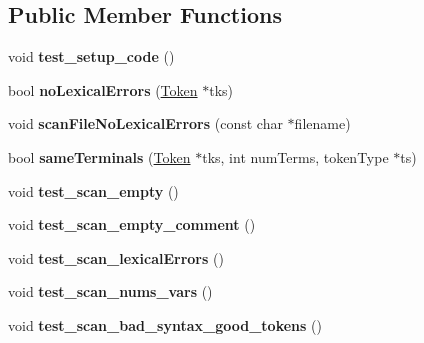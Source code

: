 \subsection*{Public Member Functions}
\begin{DoxyCompactItemize}
\item 
\hypertarget{classScannerTestSuite_ade832b9b4b3bd92980d43c4050cebd2c}{void {\bfseries test\-\_\-setup\-\_\-code} ()}\label{classScannerTestSuite_ade832b9b4b3bd92980d43c4050cebd2c}

\item 
\hypertarget{classScannerTestSuite_a681db679ec2418f862f478fa7678942b}{bool {\bfseries no\-Lexical\-Errors} (\hyperlink{classToken}{Token} $\ast$tks)}\label{classScannerTestSuite_a681db679ec2418f862f478fa7678942b}

\item 
\hypertarget{classScannerTestSuite_a01dc6065a02127accc049627ae234129}{void {\bfseries scan\-File\-No\-Lexical\-Errors} (const char $\ast$filename)}\label{classScannerTestSuite_a01dc6065a02127accc049627ae234129}

\item 
\hypertarget{classScannerTestSuite_a97c50725866b3a5b36c36488053a59bc}{bool {\bfseries same\-Terminals} (\hyperlink{classToken}{Token} $\ast$tks, int num\-Terms, token\-Type $\ast$ts)}\label{classScannerTestSuite_a97c50725866b3a5b36c36488053a59bc}

\item 
\hypertarget{classScannerTestSuite_a01beafb44a33f4d80baf9a4208919c07}{void {\bfseries test\-\_\-scan\-\_\-empty} ()}\label{classScannerTestSuite_a01beafb44a33f4d80baf9a4208919c07}

\item 
\hypertarget{classScannerTestSuite_a304719dd961df0714d372010cdf99ef1}{void {\bfseries test\-\_\-scan\-\_\-empty\-\_\-comment} ()}\label{classScannerTestSuite_a304719dd961df0714d372010cdf99ef1}

\item 
\hypertarget{classScannerTestSuite_af85168e66ba2b924488aca9768231367}{void {\bfseries test\-\_\-scan\-\_\-lexical\-Errors} ()}\label{classScannerTestSuite_af85168e66ba2b924488aca9768231367}

\item 
\hypertarget{classScannerTestSuite_a4bd4d5fc2218f3d28b08b2821ecc271b}{void {\bfseries test\-\_\-scan\-\_\-nums\-\_\-vars} ()}\label{classScannerTestSuite_a4bd4d5fc2218f3d28b08b2821ecc271b}

\item 
\hypertarget{classScannerTestSuite_aad7648d262ef3c103f0792ef73aa3bd8}{void {\bfseries test\-\_\-scan\-\_\-bad\-\_\-syntax\-\_\-good\-\_\-tokens} ()}\label{classScannerTestSuite_aad7648d262ef3c103f0792ef73aa3bd8}


\end{DoxyCompactItemize}
